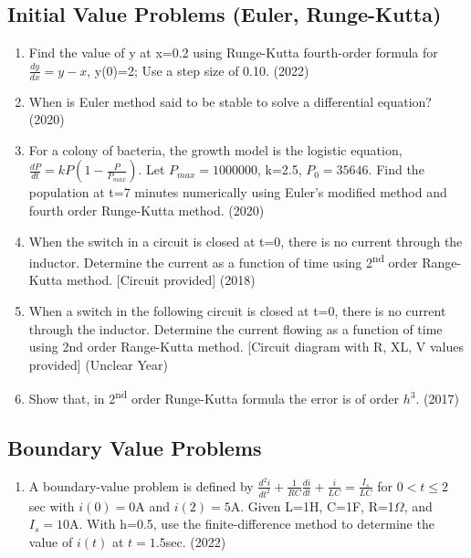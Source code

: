 \documentclass[12pt, a4paper]{article}
\begin{document}
	\subsection{Initial Value Problems (Euler, Runge-Kutta)}
	\begin{enumerate}
		\item Find the value of y at x=0.2 using Runge-Kutta fourth-order formula for $\frac{dy}{dx} = y - x$, y(0)=2; Use a step size of 0.10. (2022)
		\item When is Euler method said to be stable to solve a differential equation? (2020)
		\item For a colony of bacteria, the growth model is the logistic equation, $\frac{dP}{dt} = kP(1-\frac{P}{P_{max}})$. Let $P_{max}=1000000$, k=2.5, $P_0=35646$. Find the population at t=7 minutes numerically using Euler's modified method and fourth order Runge-Kutta method. (2020)
		\item When the switch in a circuit is closed at t=0, there is no current through the inductor. Determine the current as a function of time using 2\textsuperscript{nd} order Range-Kutta method. [Circuit provided] (2018)
		\item When a switch in the following circuit is closed at t=0, there is no current through the inductor. Determine the current flowing as a function of time using 2nd order Range-Kutta method. [Circuit diagram with R, XL, V values provided] (Unclear Year)
		\item Show that, in 2\textsuperscript{nd} order Runge-Kutta formula the error is of order $h^3$. (2017)
	\end{enumerate}
	
	\subsection{Boundary Value Problems}
	\begin{enumerate}
		\item A boundary-value problem is defined by $\frac{d^2i}{dt^2} + \frac{1}{RC}\frac{di}{dt} + \frac{i}{LC} = \frac{I_s}{LC}$ for $0 < t \le 2$ sec with $i(0)=0$A and $i(2)=5$A. Given L=1H, C=1F, R=1$\Omega$, and $I_s=10$A. With h=0.5, use the finite-difference method to determine the value of $i(t)$ at $t=1.5$sec. (2022)
	\end{enumerate}
	
\end{document}
